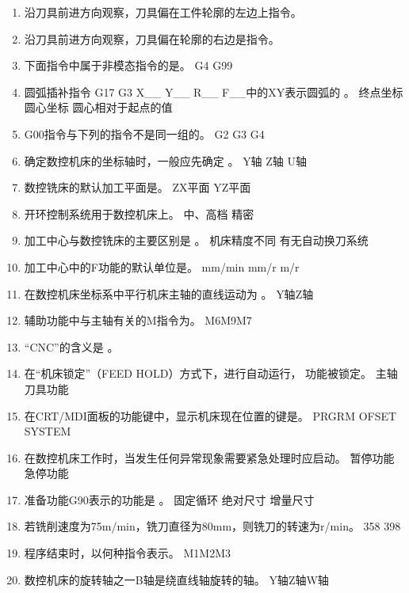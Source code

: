 \documentclass{HUNNUexam}
\begin{document}
\begin{enumerate} [1.]
	\item 沿刀具前进方向观察，刀具偏在工件轮廓的左边上指令。
	\item 沿刀具前进方向观察，刀具偏在轮廓的右边是指令。
	\item 下面指令中属于非模态指令的是。
	      	{G4}	{G99}
	\item 圆弧插补指令 G17 G3 X\_\_ Y\_\_ R\_\_ F\_\_中的XY表示圆弧的	。
	      	{终点坐标}	{圆心坐标}	{圆心相对于起点的值}
	\item G00指令与下列的指令不是同一组的。
	      		{G2}	{G3}	{G4}
	\item 确定数控机床的坐标轴时，一般应先确定	。
	      	{Y轴} {Z轴}		{U轴}
	\item 数控铣床的默认加工平面是。
	      		{ZX平面}		{YZ平面}
	\item 开环控制系统用于数控机床上。
	      		{中、高档}		{精密}
	\item 加工中心与数控铣床的主要区别是	。
	      	{机床精度不同}	{有无自动换刀系统}
	\item 加工中心中的F功能的默认单位是。
	      	{mm/min}	{mm/r}	{m/r}
	\item 在数控机床坐标系中平行机床主轴的直线运动为	。
	      	{Y轴}{Z轴}
	\item 辅助功能中与主轴有关的M指令为。
	       {M6}{M9}{M7}
	\item “CNC”的含义是	。
	\item 在“机床锁定”（FEED HOLD）方式下，进行自动运行，	功能被锁定。
	      	{主轴} {刀具功能}
	\item 在CRT/MDI面板的功能键中，显示机床现在位置的键是。
	      	{PRGRM}	{OFSET}	{SYSTEM}
	\item 在数控机床工作时，当发生任何异常现象需要紧急处理时应启动。
	      	{暂停功能}	{急停功能}
	\item 准备功能G90表示的功能是	。
	      	{固定循环}	{绝对尺寸}	{增量尺寸}
	\item 若铣削速度为75m/min，铣刀直径为80mm，则铣刀的转速为r/min。
	      	{358}	{398}
	\item 程序结束时，以何种指令表示。
	      	{M1}{M2}{M3}
	\item 数控机床的旋转轴之一B轴是绕直线轴旋转的轴。
	      	{Y轴}{Z轴}{W轴}
\end{enumerate}
\end{document}
